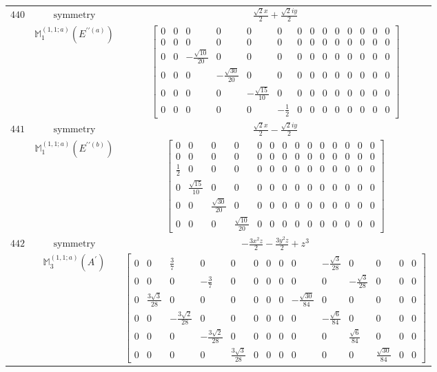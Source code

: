 \documentclass[fleqn,8pt,landscape]{jsarticle}
\begin{document}
\begin{longtable}{ccc}
$ 440 $ & $ \text{symmetry} $ & $ \frac{\sqrt{2} x}{2} + \frac{\sqrt{2} i y}{2} $ \\
$  $ & $ \mathbb{M}_{1}^{(1,1;a)}(E^{\prime\prime(a)}) $ & $ \begin{bmatrix} 0 & 0 & 0 & 0 & 0 & 0 & 0 & 0 & 0 & 0 & 0 & 0 & 0 & 0 \\ 0 & 0 & 0 & 0 & 0 & 0 & 0 & 0 & 0 & 0 & 0 & 0 & 0 & 0 \\ 0 & 0 & - \frac{\sqrt{10}}{20} & 0 & 0 & 0 & 0 & 0 & 0 & 0 & 0 & 0 & 0 & 0 \\ 0 & 0 & 0 & - \frac{\sqrt{30}}{20} & 0 & 0 & 0 & 0 & 0 & 0 & 0 & 0 & 0 & 0 \\ 0 & 0 & 0 & 0 & - \frac{\sqrt{15}}{10} & 0 & 0 & 0 & 0 & 0 & 0 & 0 & 0 & 0 \\ 0 & 0 & 0 & 0 & 0 & - \frac{1}{2} & 0 & 0 & 0 & 0 & 0 & 0 & 0 & 0 \end{bmatrix} $ \\ \hline
$ 441 $ & $ \text{symmetry} $ & $ \frac{\sqrt{2} x}{2} - \frac{\sqrt{2} i y}{2} $ \\
$  $ & $ \mathbb{M}_{1}^{(1,1;a)}(E^{\prime\prime(b)}) $ & $ \begin{bmatrix} 0 & 0 & 0 & 0 & 0 & 0 & 0 & 0 & 0 & 0 & 0 & 0 & 0 & 0 \\ 0 & 0 & 0 & 0 & 0 & 0 & 0 & 0 & 0 & 0 & 0 & 0 & 0 & 0 \\ \frac{1}{2} & 0 & 0 & 0 & 0 & 0 & 0 & 0 & 0 & 0 & 0 & 0 & 0 & 0 \\ 0 & \frac{\sqrt{15}}{10} & 0 & 0 & 0 & 0 & 0 & 0 & 0 & 0 & 0 & 0 & 0 & 0 \\ 0 & 0 & \frac{\sqrt{30}}{20} & 0 & 0 & 0 & 0 & 0 & 0 & 0 & 0 & 0 & 0 & 0 \\ 0 & 0 & 0 & \frac{\sqrt{10}}{20} & 0 & 0 & 0 & 0 & 0 & 0 & 0 & 0 & 0 & 0 \end{bmatrix} $ \\ \hline
$ 442 $ & $ \text{symmetry} $ & $ - \frac{3 x^{2} z}{2} - \frac{3 y^{2} z}{2} + z^{3} $ \\
$  $ & $ \mathbb{M}_{3}^{(1,1;a)}(A^{\prime}) $ & $ \begin{bmatrix} 0 & 0 & \frac{3}{7} & 0 & 0 & 0 & 0 & 0 & 0 & - \frac{\sqrt{3}}{28} & 0 & 0 & 0 & 0 \\ 0 & 0 & 0 & - \frac{3}{7} & 0 & 0 & 0 & 0 & 0 & 0 & - \frac{\sqrt{3}}{28} & 0 & 0 & 0 \\ 0 & \frac{3 \sqrt{3}}{28} & 0 & 0 & 0 & 0 & 0 & 0 & - \frac{\sqrt{30}}{84} & 0 & 0 & 0 & 0 & 0 \\ 0 & 0 & - \frac{3 \sqrt{2}}{28} & 0 & 0 & 0 & 0 & 0 & 0 & - \frac{\sqrt{6}}{84} & 0 & 0 & 0 & 0 \\ 0 & 0 & 0 & - \frac{3 \sqrt{2}}{28} & 0 & 0 & 0 & 0 & 0 & 0 & \frac{\sqrt{6}}{84} & 0 & 0 & 0 \\ 0 & 0 & 0 & 0 & \frac{3 \sqrt{3}}{28} & 0 & 0 & 0 & 0 & 0 & 0 & \frac{\sqrt{30}}{84} & 0 & 0 \end{bmatrix} $ \\ \hline

\end{longtable}
\end{document}
